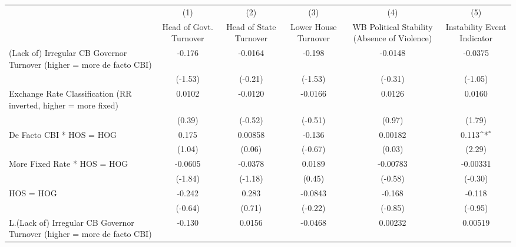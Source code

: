 {
\def\sym#1{\ifmmode^{#1}\else\(^{#1}\)\fi}
\begin{longtable}{l*{5}{c}}
\toprule\endfirsthead\midrule\endhead\midrule\endfoot\endlastfoot
                &\multicolumn{1}{c}{(1)}&\multicolumn{1}{c}{(2)}&\multicolumn{1}{c}{(3)}&\multicolumn{1}{c}{(4)}&\multicolumn{1}{c}{(5)}\\
                &\multicolumn{1}{c}{Head of Govt. Turnover}&\multicolumn{1}{c}{Head of State Turnover}&\multicolumn{1}{c}{Lower House Turnover}&\multicolumn{1}{c}{WB Political Stability (Absence of Violence)}&\multicolumn{1}{c}{Instability Event Indicator}\\
\midrule
(Lack of) Irregular CB Governor Turnover (higher = more de facto CBI)&   -0.176         &  -0.0164         &   -0.198         &  -0.0148         &  -0.0375         \\
                &  (-1.53)         &  (-0.21)         &  (-1.53)         &  (-0.31)         &  (-1.05)         \\
\addlinespace
Exchange Rate Classification (RR inverted, higher = more fixed)&   0.0102         &  -0.0120         &  -0.0166         &   0.0126         &   0.0160         \\
                &   (0.39)         &  (-0.52)         &  (-0.51)         &   (0.97)         &   (1.79)         \\
\addlinespace
De Facto CBI * HOS = HOG&    0.175         &  0.00858         &   -0.136         &  0.00182         &    0.113\sym{*}  \\
                &   (1.04)         &   (0.06)         &  (-0.67)         &   (0.03)         &   (2.29)         \\
\addlinespace
More Fixed Rate * HOS = HOG&  -0.0605         &  -0.0378         &   0.0189         & -0.00783         & -0.00331         \\
                &  (-1.84)         &  (-1.18)         &   (0.45)         &  (-0.58)         &  (-0.30)         \\
\addlinespace
HOS = HOG       &   -0.242         &    0.283         &  -0.0843         &   -0.168         &   -0.118         \\
                &  (-0.64)         &   (0.71)         &  (-0.22)         &  (-0.85)         &  (-0.95)         \\
\addlinespace
L.(Lack of) Irregular CB Governor Turnover (higher = more de facto CBI)&   -0.130         &   0.0156         &  -0.0468         &  0.00232         &  0.00519         \\

\end{longtable}}
